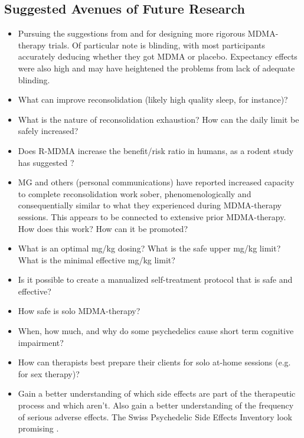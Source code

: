 \documentclass[12pt,letterpaper]{article}
\begin{document}
\subsection{Suggested Avenues of Future Research}
\begin{itemize}
    \item Pursuing the suggestions from \textcite{adayMethodologicalRigor} and \textcite{vanElkMethodology} for designing more rigorous MDMA-therapy trials. Of particular note is blinding, with most participants accurately deducing whether they got MDMA or placebo. Expectancy effects were also high and may have heightened the problems from lack of adequate blinding.
    \item What can improve reconsolidation (likely high quality sleep, for instance)?
    \item What is the nature of reconsolidation exhaustion? How can the daily limit be safely increased?
    \item Does R-MDMA increase the benefit/risk ratio in humans, as a rodent study has suggested \cite{curry2018RMDMA}?
    \item MG and others (personal communications) have reported increased capacity to complete reconsolidation work sober, phenomenologically and consequentially similar to what they experienced during MDMA-therapy sessions. This appears to be connected to extensive prior MDMA-therapy. How does this work? How can it be promoted?
    \item What is an optimal mg/kg dosing? What is the safe upper mg/kg limit? What is the minimal effective mg/kg limit?
    \item Is it possible to create a manualized self-treatment protocol that is safe and effective?
    \item How safe is solo MDMA-therapy?
    \item When, how much, and why do some psychedelics cause short term cognitive impairment?
    \item How can therapists best prepare their clients for solo at-home sessions (e.g. for sex therapy)?
    \item Gain a better understanding of which side effects are part of the therapeutic process and which aren't. Also gain a better understanding of the frequency of serious adverse effects. The Swiss Psychedelic Side Effects Inventory look promising \cite{caldervalidation}.
\end{itemize}
\printbibliography
{}
\end{document}

